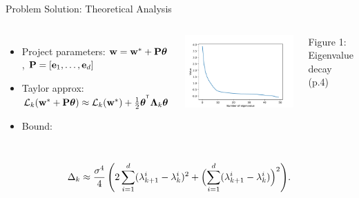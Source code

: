 \documentclass{beamer}
\begin{document}
\begin{frame}{Problem Solution: Theoretical Analysis}
    \begin{columns}[c]
        \begin{itemize}
            \item Project parameters: $\mathbf{w} = \mathbf{w}^* + \mathbf{P} \boldsymbol{\theta}$, $\mathbf{P} = [\mathbf{e}_1, \dots, \mathbf{e}_d]$
            \item Taylor approx: $\mathcal{L}_k (\mathbf{w}^* + \mathbf{P} \boldsymbol{\theta}) \approx \mathcal{L}_k (\mathbf{w}^*) + \tfrac12 \boldsymbol{\theta}^{^{\text{\tiny\sffamily\upshape\mdseries T}}} \boldsymbol{\Lambda}_k \boldsymbol{\theta}$
                  \bigskip
                  \bigskip
            \item Bound:
        \end{itemize}
        \includegraphics[width=1.0\textwidth]{img/eigenvalues.pdf}
        \vspace{0.5cm}\hspace{1.8cm}\raggedright{\tiny Figure 1: Eigenvalue decay (p.4)}
    \end{columns}
    $$
        \Delta_k \approx
        \frac{\sigma^4}{4}\, \Biggl( 2 \sum_{i=1}^d (\lambda_{k+1}^i - \lambda_k^i)^2
        + \Bigl( \sum_{i=1}^d (\lambda_{k+1}^i - \lambda_k^i) \Bigr)^2 \Biggr).
    $$
\end{frame}
\end{document}
